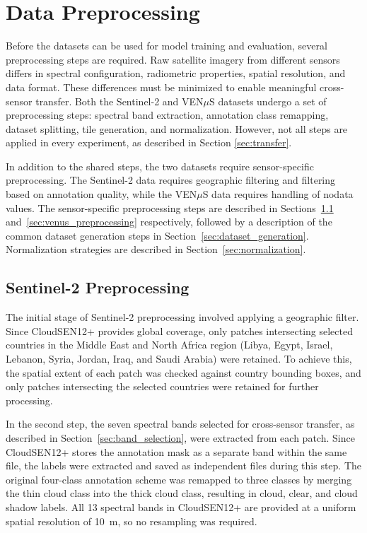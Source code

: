 \section{Data Preprocessing}
\label{sec:preprocessing}

Before the datasets can be used for model training and evaluation, several preprocessing steps are required. Raw satellite imagery from different sensors differs in spectral configuration, radiometric properties, spatial resolution, and data format. These differences must be minimized to enable meaningful cross-sensor transfer. Both the Sentinel-2 and VEN$\mu$S datasets undergo a set of preprocessing steps: spectral band extraction, annotation class remapping, dataset splitting, tile generation, and normalization. However, not all steps are applied in every experiment, as described in Section \ref{sec:transfer}.

In addition to the shared steps, the two datasets require sensor-specific preprocessing. The Sentinel-2 data requires geographic filtering and filtering based on annotation quality, while the VEN$\mu$S data requires handling of nodata values. The sensor-specific preprocessing steps are described in Sections~\ref{sec:s2_preprocessing} and~\ref{sec:venus_preprocessing} respectively, followed by a description of the common dataset generation steps in Section~\ref{sec:dataset_generation}. Normalization strategies are described in Section~\ref{sec:normalization}.

\subsection{Sentinel-2 Preprocessing}
\label{sec:s2_preprocessing}

The initial stage of Sentinel-2 preprocessing involved applying a geographic filter. Since CloudSEN12+ provides global coverage, only patches intersecting selected countries in the Middle East and North Africa region (Libya, Egypt, Israel, Lebanon, Syria, Jordan, Iraq, and Saudi Arabia) were retained. To achieve this, the spatial extent of each patch was checked against country bounding boxes, and only patches intersecting the selected countries were retained for further processing.

In the second step, the seven spectral bands selected for cross-sensor transfer, as described in Section~\ref{sec:band_selection}, were extracted from each patch. Since CloudSEN12+ stores the annotation mask as a separate band within the same file, the labels were extracted and saved as independent files during this step. The original four-class annotation scheme was remapped to three classes by merging the thin cloud class into the thick cloud class, resulting in cloud, clear, and cloud shadow labels. All 13 spectral bands in CloudSEN12+ are provided at a uniform spatial resolution of 10~m, so no resampling was required.

